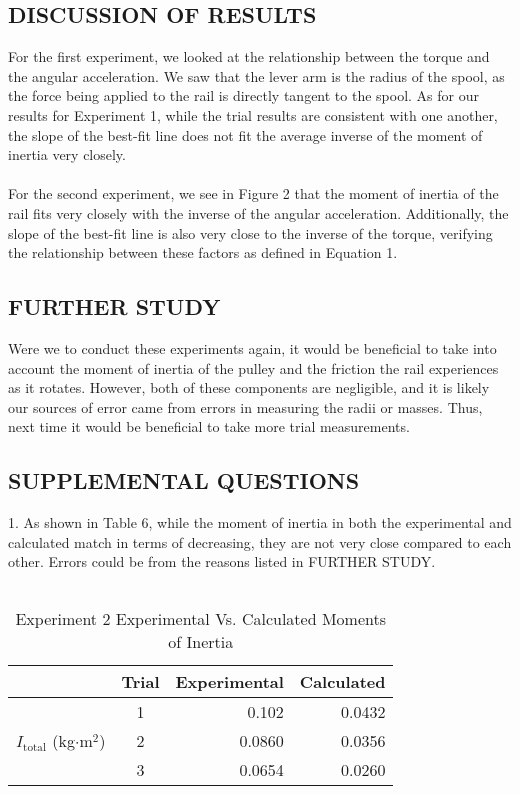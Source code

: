 \documentclass [12pt, letterpaper, twoside] {article}
\begin{document}
\subsection* {DISCUSSION OF RESULTS}
For the first experiment, we looked at the relationship between the torque and the angular acceleration. We saw that the lever arm is the radius of the spool, as the force being applied to the rail is directly tangent to the spool. As for our results for Experiment 1, while the trial results are consistent with one another, the slope of the best-fit line does not fit the average inverse of the moment of inertia very closely. \\\\
For the second experiment, we see in Figure 2 that the moment of inertia of the rail fits very closely with the inverse of the angular acceleration. Additionally, the slope of the best-fit line is also very close to the inverse of the torque, verifying the relationship between these factors as defined in Equation 1. 

\subsection* {FURTHER STUDY}
Were we to conduct these experiments again, it would be beneficial to take into account the moment of inertia of the pulley and the friction the rail experiences as it rotates. However, both of these components are negligible, and it is likely our sources of error came from errors in measuring the radii or masses. Thus, next time it would be beneficial to take more trial measurements.

\subsection* {SUPPLEMENTAL QUESTIONS}
1. As shown in Table 6, while the moment of inertia in both the experimental and calculated match in terms of decreasing, they are not very close compared to each other. Errors could be from the reasons listed in FURTHER STUDY. \\\\
\begin {table}[h!]
  \centering
  \begin {tabular} {| l | c | r | r |}
    \hline\hline
    & Trial & Experimental & Calculated \\
    \hline
    \multirow{3}{*}{\(I_{\text{total}}\) (kg\(\cdot\text{m}^2\))} & 1 & 0.102 & 0.0432 \\ %
    & 2 & 0.0860 & 0.0356 \\ %
    & 3 & 0.0654 & 0.0260 \\ %
    \hline\hline
  \end {tabular}
  \caption {Experiment 2 Experimental Vs. Calculated Moments of Inertia}
\end {table}
\end{document}
